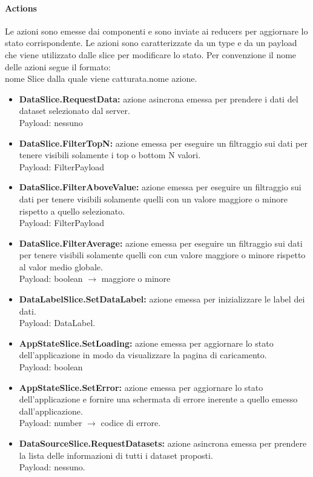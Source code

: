     \paragraph{Actions}
        Le azioni sono emesse dai componenti e sono inviate ai reducers per aggiornare lo stato corrispondente.
        Le azioni sono caratterizzate da un type e da un payload che viene utilizzato dalle slice
        per modificare lo stato.
        Per convenzione il nome delle azioni segue il formato: \\
        nome Slice dalla quale viene catturata.nome azione.
        \begin{itemize}
            \item \textbf{DataSlice.RequestData:} azione asincrona emessa per prendere i dati del dataset selezionato dal server. \\ Payload: nessuno
            \item \textbf{DataSlice.FilterTopN:} azione emessa per eseguire un filtraggio sui dati per tenere visibili solamente i top o bottom N valori.\\ Payload: FilterPayload
            \item \textbf{DataSlice.FilterAboveValue:} azione emessa per eseguire un filtraggio sui dati per tenere visibili solamente quelli con un valore maggiore o minore rispetto a quello selezionato.\\ Payload: FilterPayload
            \item \textbf{DataSlice.FilterAverage:} azione emessa per eseguire un filtraggio sui dati per tenere visibili solamente quelli con cun valore maggiore o minore rispetto al valor medio globale. \\ Payload: boolean $\rightarrow$ maggiore o minore
            \item \textbf{DataLabelSlice.SetDataLabel:} azione emessa per inizializzare le label dei dati.\\ Payload: DataLabel.
            \item \textbf{AppStateSlice.SetLoading:} azione emessa per aggiornare lo stato dell'applicazione in modo da visualizzare la pagina di caricamento. \\ Payload: boolean
            \item \textbf{AppStateSlice.SetError:} azione emessa per aggiornare lo stato dell'applicazione e fornire una schermata di errore inerente a quello emesso dall'applicazione. \\ Payload: number $\rightarrow$ codice di errore.
            \item \textbf{DataSourceSlice.RequestDatasets:} azione asincrona emessa per prendere la lista delle informazioni di tutti i dataset proposti. \\ Payload: nessuno.

\end{itemize}
